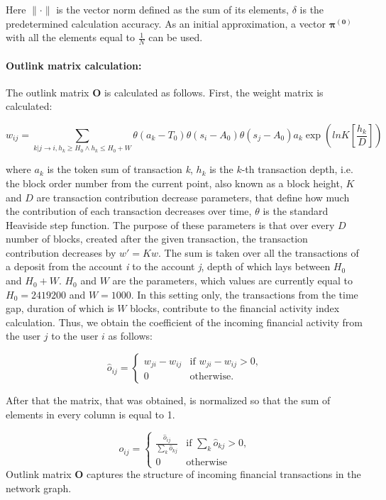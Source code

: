 \documentclass[a4paper,12pt]{article}
\begin{document}
Here $\lVert \cdot \rVert$ is the vector norm defined as the sum of its elements, $\delta$ is the predetermined calculation accuracy. As an initial approximation, a vector $\boldsymbol{\pi^{(0)}}$ with all the elements equal to $\frac{1}{N}$ can be used.



\paragraph{Outlink matrix calculation:}
The outlink matrix $\boldsymbol{O}$ is calculated as follows. First, the weight matrix is calculated:



$$
w_{ij}=\sum_{k|j \to i, {h_k \ge H_0} \land {h_k \le H_0+W}} \theta ( a_k - T_0 ) \theta ( s_i - A_0 ) \theta ( s_j - A_0 ) a_k \exp{(lnK [\frac{h_k}{D}])}
$$

where $a_k$ is the token sum of transaction \textit{k}, $h_k$ is the $k$-th transaction depth, i.e. the block order number from the current point, also known as a block height,  $K$ and $D$ are transaction contribution decrease parameters, that define how much the contribution of each transaction decreases over time, $\theta$ is the standard Heaviside step function. The purpose of these parameters is that over every $D$ number of blocks, created after the given transaction, the transaction contribution decreases by $w'=Kw$. The sum is taken over all the transactions of a deposit from the account \textit{i} to the account \textit{j}, depth of which lays between $H_0$ and $H_0+W$. $H_0$ and $W$ are the parameters, which values are currently equal to $H_0=2419200$ and $W=1000$. In this setting only, the transactions from the time gap, duration of which is $W$ blocks, contribute to the financial activity index calculation. Thus, we obtain the coefficient of the incoming financial activity from the user $j$ to the user $i$ as follows:







$$
\hat{o}_{ij} = \begin{cases}
 w_{ji}-w_{ij}
 & \text{if $w_{ji}-w_{ij} > 0$,}\\
 0 & \text{otherwise.}
\end{cases}
$$

After that the matrix, that was obtained,  is normalized so that the sum of elements in every column is equal to 1.


$$
o_{ij} = \begin{cases}
 \frac{\hat{o}_{ij}} {\sum\limits_{k} \hat{o}_{kj}}
 & \text{if $\sum\limits_{k} \hat{o}_{kj}> 0$,}\\
 0 & \text{otherwise}
\end{cases} 
$$
Outlink matrix $\boldsymbol{O}$ captures the structure of incoming financial transactions in the network graph.
\end{document}
